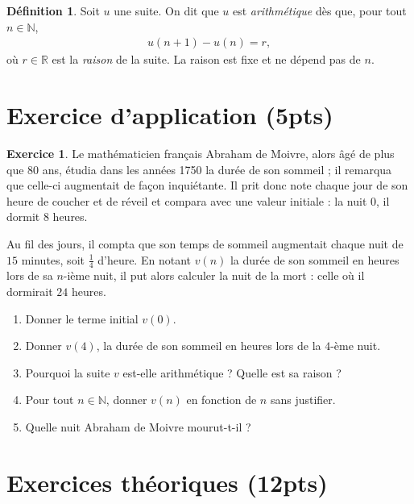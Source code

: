 \documentclass[12pt]{paper}
\theoremstyle{plain}
\theoremstyle{definition}
\newtheorem{ex}{Exercice}
\newtheorem{definition}{Définition}
\newcommand{\R}{\mathbb{R}}
\newcommand{\N}{\mathbb{N}}
\begin{document}
\pagestyle{fancy}
\fancyhead[R]{\today}

\begin{definition}\label{def:1}
	Soit $u$ une suite. On dit que $u$ est \emph{arithmétique} dès que, pour tout $n\in\N$,
		\begin{align}\label{eq:def}
			u(n+1) - u(n) = r,
		\end{align}
	où $r\in\R$ est la \emph{raison} de la suite. La raison est fixe et ne dépend pas de $n$.
\end{definition}



\section*{Exercice d'application (5pts)}

\begin{ex}
	Le mathématicien français Abraham de Moivre, alors âgé de plus que 80 ans, étudia dans les années 1750 la durée de son sommeil ; il remarqua que celle-ci augmentait de façon inquiétante.
	Il prit donc note chaque jour de son heure de coucher et de réveil et compara avec une valeur initiale : la nuit $0$, il dormit $8$ heures.
	
	Au fil des jours, il compta que son temps de sommeil augmentait chaque nuit de $15$ minutes, soit $\frac14$ d'heure.
	En notant $v(n)$ la durée de son sommeil en heures lors de sa $n$-ième nuit, il put alors calculer la nuit de la mort : celle où il dormirait $24$ heures.
	\begin{enumerate}
		\item Donner le terme initial $v(0)$.
		\item Donner $v(4)$, la durée de son sommeil en heures lors de la $4$-ème nuit.
		\item Pourquoi la suite $v$ est-elle arithmétique ? Quelle est sa raison ?
		\item Pour tout $n\in\N$, donner $v(n)$ en fonction de $n$ sans justifier.
		\item Quelle nuit Abraham de Moivre mourut-t-il ?
	\end{enumerate}
\end{ex}

\section*{Exercices théoriques (12pts)}
\end{document}

